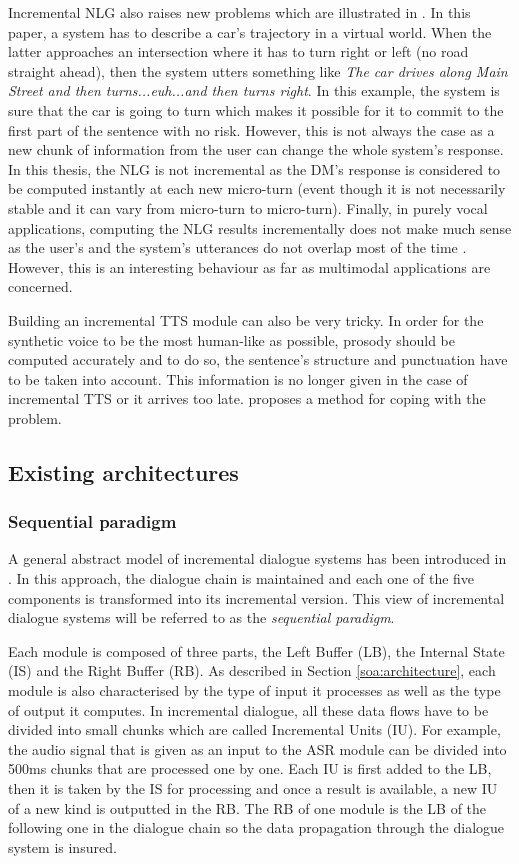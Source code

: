 Incremental NLG also raises new problems which are illustrated in \cite{Baumann2013}. In this paper, a system has to describe a car's trajectory in a virtual world. When the latter approaches an intersection where it has to turn right or left (no road straight ahead), then the system utters something like \textit{The car drives along Main Street and then turns...euh...and then turns right}. In this example, the system is sure that the car is going to turn which makes it possible for it to commit to the first part of the sentence with no risk. However, this is not always the case as a new chunk of information from the user can change the whole system's response. In this thesis, the NLG is not incremental as the DM's response is considered to be computed instantly at each new micro-turn (event though it is not necessarily stable and it can vary from micro-turn to micro-turn). Finally, in purely vocal applications, computing the NLG results incrementally does not make much sense as the user's and the system's utterances do not overlap most of the time \cite{Sacks1974}. However, this is an interesting behaviour as far as multimodal applications are concerned.

Building an incremental TTS module can also be very tricky. In order for the synthetic voice to be the most human-like as possible, prosody should be computed accurately and to do so, the sentence's structure and punctuation have to be taken into account. This information is no longer given in the case of incremental TTS or it arrives too late. \cite{Baumann2014} proposes a method for coping with the problem. 


\subsection{Existing architectures}
\subsubsection{Sequential paradigm}

A general abstract model of incremental dialogue systems has been introduced in \cite{Schlangen2011}. In this approach, the dialogue chain is maintained and each one of the five components is transformed into its incremental version. This view of incremental dialogue systems will be referred to as the \textit{sequential paradigm}.

Each module is composed of three parts, the Left Buffer (LB), the Internal State (IS) and the Right Buffer (RB). As described in Section \ref{soa:architecture}, each module is also characterised by the type of input it processes as well as the type of output it computes. In incremental dialogue, all these data flows have to be divided into small chunks which are called Incremental Units (IU). For example, the audio signal that is given as an input to the ASR module can be divided into 500ms chunks that are processed one by one. Each IU is first added to the LB, then it is taken by the IS for processing and once a result is available, a new IU of a new kind is outputted in the RB. The RB of one module is the LB of the following one in the dialogue chain so the data propagation through the dialogue system is insured.

